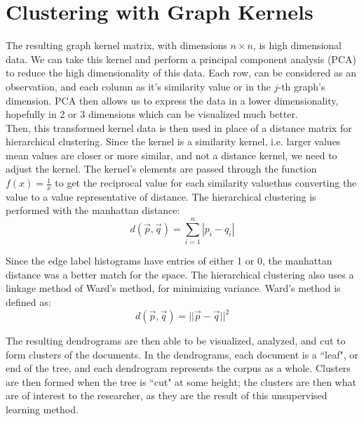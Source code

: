 %
%
%

\section{Clustering with Graph Kernels}

\hspace*{0.3cm} The resulting graph kernel matrix, with dimensions $n \times n$, is high dimensional data. We can take this kernel and perform a principal component analysis (PCA) to reduce the high dimensionality of this data. Each row, can be considered as an observation, and each column as it's similarity value or in the $j$-th graph's dimension. PCA then allows us to express the data in a lower dimensionality, hopefully in 2 or 3 dimensions which can be visualized much better. \\

Then, this transformed kernel data is then used in place of a distance matrix for hierarchical clustering. Since the kernel is a similarity kernel, i.e. larger values mean values are closer or more similar, and not a distance kernel, we need to adjust the kernel. The kernel's elements are passed through the function $f(x) = \frac{1}{x}$ to get the reciprocal value for each similarity value\textemdash thus converting the value to a value representative of distance. The hierarchical clustering is performed with the manhattan distance: \\

\begin{equation}
d(\vec{p},\vec{q}) = \sum_{i=1}^n |p_i - q_i|
\end{equation}

Since the edge label histograms have entries of either 1 or 0, the manhattan distance was a better match for the space. The hierarchical clustering also uses a linkage method of Ward's method, for minimizing variance. Ward's method is defined as:\\

\begin{equation}
d(\vec{p},\vec{q}) = || \vec{p} - \vec{q} ||^2
\end{equation}

The resulting dendrograms are then able to be visualized, analyzed, and cut to form clusters of the documents. In the dendrograms, each document is a ``leaf", or end of the tree, and each dendrogram represents the corpus as a whole. Clusters are then formed when the tree is ``cut" at some height; the clusters are then what are of interest to the researcher, as they are the result of this unsupervised learning method. 